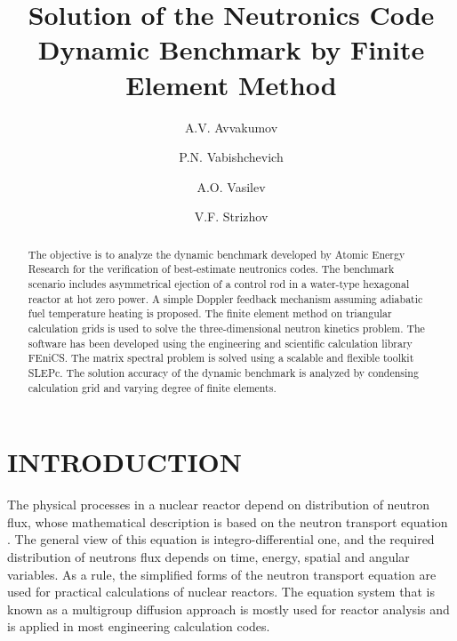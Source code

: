 \documentclass{aip-cp}
\begin{document}
\title{Solution of the Neutronics Code Dynamic Benchmark by Finite Element Method}

\author[aff1]{A.V. Avvakumov}
\author[aff2]{P.N. Vabishchevich}
\author[aff3]{A.O. Vasilev}
\author[aff2]{V.F. Strizhov}


\maketitle

\begin{abstract}
The objective is to analyze the dynamic benchmark developed by Atomic Energy Research for the verification of best-estimate neutronics codes. The benchmark scenario includes asymmetrical ejection of a control rod in a water-type hexagonal reactor at hot zero power. A simple Doppler feedback mechanism assuming adiabatic fuel temperature heating is proposed. The finite element method on triangular calculation grids is used to solve the three-dimensional neutron kinetics problem. The software has been developed using the engineering and scientific calculation library FEniCS. The matrix spectral problem is solved using a scalable and flexible toolkit SLEPc. The solution accuracy of the dynamic benchmark is analyzed by condensing calculation grid and varying degree of finite elements.
\end{abstract}

\section{INTRODUCTION}
The physical processes in a nuclear reactor \cite{duderstadt1976nuclear}
depend on distribution of neutron flux, whose mathematical description is based on the neutron transport equation \cite{stacey}. 
The general view of this equation is integro-differential one, and the required distribution of neutrons flux depends on time, energy, spatial and angular variables. As a rule, the simplified forms of the neutron transport equation are used for practical calculations of nuclear reactors. The equation system that is known as a multigroup diffusion approach is mostly used for reactor analysis \cite{marchuk1986numerical}
and is applied in most engineering calculation codes.
\end{document}
